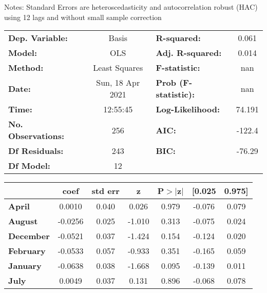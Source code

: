 Notes: \newline
 [1] Standard Errors are heteroscedasticity and autocorrelation robust (HAC) using 12 lags and without small sample correction
\begin{center}
\begin{tabular}{lclc}
\toprule
\textbf{Dep. Variable:}    &      Basis       & \textbf{  R-squared:         } &     0.061   \\
\textbf{Model:}            &       OLS        & \textbf{  Adj. R-squared:    } &     0.014   \\
\textbf{Method:}           &  Least Squares   & \textbf{  F-statistic:       } &       nan   \\
\textbf{Date:}             & Sun, 18 Apr 2021 & \textbf{  Prob (F-statistic):} &      nan    \\
\textbf{Time:}             &     12:55:45     & \textbf{  Log-Likelihood:    } &    74.191   \\
\textbf{No. Observations:} &         256      & \textbf{  AIC:               } &    -122.4   \\
\textbf{Df Residuals:}     &         243      & \textbf{  BIC:               } &    -76.29   \\
\textbf{Df Model:}         &          12      & \textbf{                     } &             \\
\bottomrule
\end{tabular}
\begin{tabular}{lcccccc}
                   & \textbf{coef} & \textbf{std err} & \textbf{z} & \textbf{P$> |$z$|$} & \textbf{[0.025} & \textbf{0.975]}  \\
\midrule
\textbf{April}     &       0.0010  &        0.040     &     0.026  &         0.979        &       -0.076    &        0.079     \\
\textbf{August}    &      -0.0256  &        0.025     &    -1.010  &         0.313        &       -0.075    &        0.024     \\
\textbf{December}  &      -0.0521  &        0.037     &    -1.424  &         0.154        &       -0.124    &        0.020     \\
\textbf{February}  &      -0.0533  &        0.057     &    -0.933  &         0.351        &       -0.165    &        0.059     \\
\textbf{January}   &      -0.0638  &        0.038     &    -1.668  &         0.095        &       -0.139    &        0.011     \\
\textbf{July}      &       0.0049  &        0.037     &     0.131  &         0.896        &       -0.068    &        0.078     \\

\end{tabular}
\end{center}
